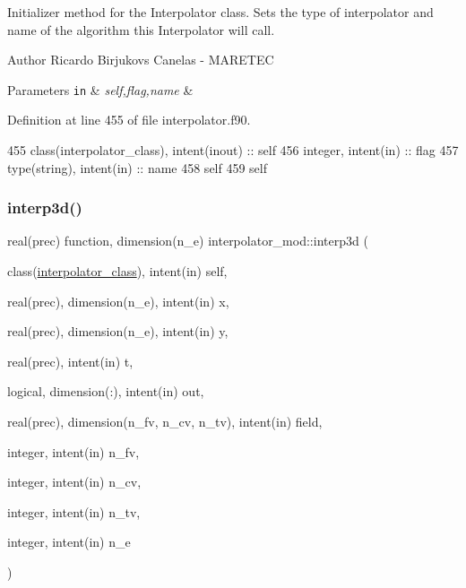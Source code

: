 Initializer method for the Interpolator class. Sets the type of interpolator and name of the algorithm this Interpolator will call. 

\begin{DoxyAuthor}{Author}
Ricardo Birjukovs Canelas -\/ M\+A\+R\+E\+T\+EC 
\end{DoxyAuthor}

\begin{DoxyParams}[1]{Parameters}
\mbox{\tt in}  & {\em self,flag,name} & \\
\hline
\end{DoxyParams}


Definition at line 455 of file interpolator.\+f90.


\begin{DoxyCode}
455     \textcolor{keywordtype}{class}(interpolator\_class), \textcolor{keywordtype}{intent(inout)} :: self
456     \textcolor{keywordtype}{integer}, \textcolor{keywordtype}{intent(in)} :: flag
457     \textcolor{keywordtype}{type}(string), \textcolor{keywordtype}{intent(in)} :: name
458     self%
459     self%
\end{DoxyCode}
\mbox{\label{namespaceinterpolator__mod_a15031a389a46159257dd4c2b15174a0b}} 
\subsubsection{\texorpdfstring{interp3d()}{interp3d()}}
{\footnotesize\ttfamily real(prec) function, dimension(n\+\_\+e) interpolator\+\_\+mod\+::interp3d (\begin{DoxyParamCaption}\item[{class(\mbox{\hyperlink{structinterpolator__mod_1_1interpolator__class}{interpolator\+\_\+class}}), intent(in)}]{self,  }\item[{real(prec), dimension(n\+\_\+e), intent(in)}]{x,  }\item[{real(prec), dimension(n\+\_\+e), intent(in)}]{y,  }\item[{real(prec), intent(in)}]{t,  }\item[{logical, dimension(\+:), intent(in)}]{out,  }\item[{real(prec), dimension(n\+\_\+fv, n\+\_\+cv, n\+\_\+tv), intent(in)}]{field,  }\item[{integer, intent(in)}]{n\+\_\+fv,  }\item[{integer, intent(in)}]{n\+\_\+cv,  }\item[{integer, intent(in)}]{n\+\_\+tv,  }\item[{integer, intent(in)}]{n\+\_\+e }\end{DoxyParamCaption})\hspace{0.3cm}{\ttfamily [private]}}




